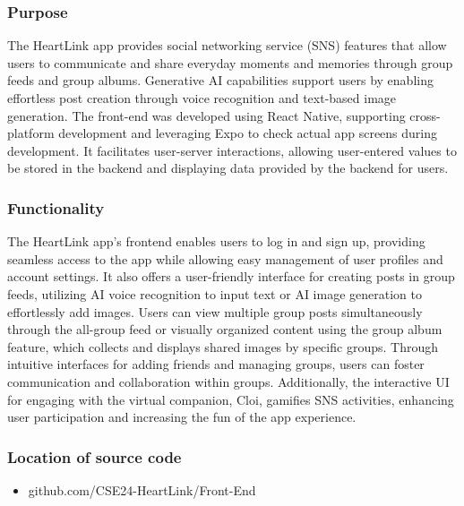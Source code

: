         \subsubsection{Purpose}
            The HeartLink app provides social networking service (SNS) features that allow users to communicate and share everyday moments and memories through group feeds and group albums. Generative AI capabilities support users by enabling effortless post creation through voice recognition and text-based image generation. The front-end was developed using React Native, supporting cross-platform development and leveraging Expo to check actual app screens during development. It facilitates user-server interactions, allowing user-entered values to be stored in the backend and displaying data provided by the backend for users.\\
            \vspace{3mm}
        \subsubsection{Functionality}
            The HeartLink app's frontend enables users to log in and sign up, providing seamless access to the app while allowing easy management of user profiles and account settings. It also offers a user-friendly interface for creating posts in group feeds, utilizing AI voice recognition to input text or AI image generation to effortlessly add images. Users can view multiple group posts simultaneously through the all-group feed or visually organized content using the group album feature, which collects and displays shared images by specific groups. Through intuitive interfaces for adding friends and managing groups, users can foster communication and collaboration within groups. Additionally, the interactive UI for engaging with the virtual companion, Cloi, gamifies SNS activities, enhancing user participation and increasing the fun of the app experience.\\
            \vspace{3mm}
        \subsubsection{Location of source code}
            \begin{itemize}
                \item github.com/CSE24-HeartLink/Front-End\\
            \end{itemize}
            
